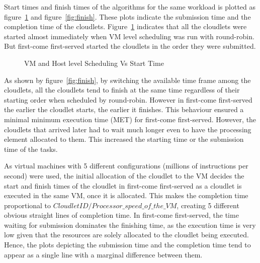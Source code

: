 \documentclass[times, 10pt,twocolumn]{article}
\begin{document}
Start times and finish times of the algorithms for the same workload is plotted as figure~\ref{fig:start} and figure~\ref{fig:finish}. These plots indicate the submission time and the completion time of the cloudlets. Figure~\ref{fig:start} indicates that all the cloudlets were started almost immediately when VM level scheduling was run with round-robin. But first-come first-served started the cloudlets in the order they were submitted. 
\begin{figure}[ht]
 \caption{VM and Host level Scheduling Vs Start Time}
 \label{fig:start}
\end{figure}

As shown by figure~\ref{fig:finish}, by switching the available time frame among the cloudlets, all the cloudlets tend to finish at the same time regardless of their starting order when scheduled by round-robin. However in first-come first-served the earlier the cloudlet starts, the earlier it finishes. This behaviour ensured a minimal minimum execution time (MET) for first-come first-served. However, the cloudlets that arrived later had to wait much longer even to have the processing element allocated to them. This increased the starting time or the submission time of the tasks. 

As virtual machines with 5 different configurations (millions of instructions per second) were used, the initial allocation of the cloudlet to the VM decides the start and finish times of the cloudlet in first-come first-served as a cloudlet is executed in the same VM, once it is allocated. This makes the completion time proportional to  $CloudletID/Processor\_speed\_of\_the\_VM$, creating 5 different obvious straight lines of completion time. In first-come first-served, the time waiting for submission dominates the finishing time, as the execution time is very low given that the resources are solely allocated to the cloudlet being executed. Hence, the plots depicting the submission time and the completion time tend to appear as a single line with a marginal difference between them.
\end{document}
